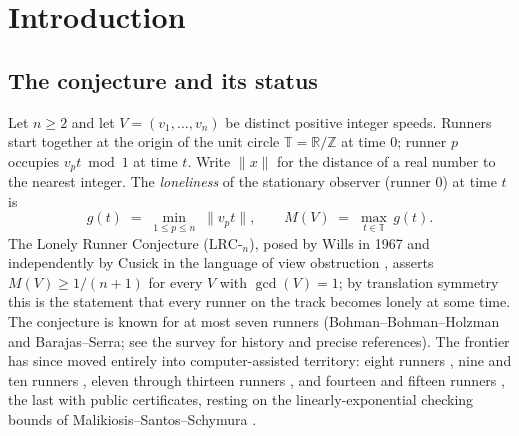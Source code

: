 \documentclass[11pt,a4paper]{article}
\numberwithin{equation}{section}
\theoremstyle{plain}
\theoremstyle{definition}
\theoremstyle{remark}
\newcommand{\Z}{\mathbb{Z}}
\newcommand{\R}{\mathbb{R}}
\newcommand{\T}{\mathbb{T}}
\newcommand{\wnc}[1]{\lVert #1 \rVert}
\begin{document}
\section{Introduction}\label{sec:intro}

\subsection{The conjecture and its status}

Let $n\ge 2$ and let $V=(v_1,\dots,v_n)$ be distinct positive integer
speeds. Runners start together at the origin of the unit circle
$\T=\R/\Z$ at time $0$; runner $p$ occupies $v_p t \bmod 1$ at time $t$.
Write $\wnc{x}$ for the distance of a real number to the nearest integer.
The \emph{loneliness} of the stationary observer (runner $0$) at time $t$
is
\[
g(t)\;=\;\min_{1\le p\le n}\;\wnc{v_p t},
\qquad
M(V)\;=\;\max_{t\in\T}\,g(t).
\]
The Lonely Runner Conjecture ($\mathrm{LRC}$-$_n$), posed by Wills in 1967
and independently by Cusick in the language of view obstruction
\cite{PS-survey,Wills,Cusick1973}, asserts $M(V)\ge 1/(n{+}1)$ for every $V$ with
$\gcd(V)=1$; by translation symmetry this is the statement that every
runner on the track becomes lonely at some time. The conjecture is known
for at most seven runners (Bohman--Bohman--Holzman and
Barajas--Serra; see the survey \cite{PS-survey} for history and precise
references). The frontier has since moved entirely into computer-assisted
territory: eight runners \cite{Rosenfeld8}, nine and ten runners
\cite{Trakulthongchai}, eleven through thirteen runners
\cite{Sungkawichai}, and fourteen and fifteen runners \cite{Allikvere},
the last with public certificates, resting on the linearly-exponential
checking bounds of Malikiosis--Santos--Schymura \cite{MSS}.
\end{document}

